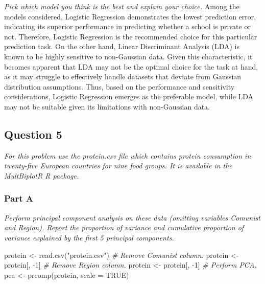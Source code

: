 \documentclass[
]{article}
\newenvironment{Shaded}{\begin{snugshade}}{\end{snugshade}}
\newcommand{\AttributeTok}[1]{\textcolor[rgb]{0.77,0.63,0.00}{#1}}
\newcommand{\CommentTok}[1]{\textcolor[rgb]{0.56,0.35,0.01}{\textit{#1}}}
\newcommand{\ConstantTok}[1]{\textcolor[rgb]{0.00,0.00,0.00}{#1}}
\newcommand{\DecValTok}[1]{\textcolor[rgb]{0.00,0.00,0.81}{#1}}
\newcommand{\FunctionTok}[1]{\textcolor[rgb]{0.00,0.00,0.00}{#1}}
\newcommand{\NormalTok}[1]{#1}
\newcommand{\OtherTok}[1]{\textcolor[rgb]{0.56,0.35,0.01}{#1}}
\newcommand{\SpecialCharTok}[1]{\textcolor[rgb]{0.00,0.00,0.00}{#1}}
\newcommand{\StringTok}[1]{\textcolor[rgb]{0.31,0.60,0.02}{#1}}
\begin{document}
\emph{Pick which model you think is the best and explain your choice.}
Among the models considered, Logistic Regression demonstrates the lowest
prediction error, indicating its superior performance in predicting
whether a school is private or not. Therefore, Logistic Regression is
the recommended choice for this particular prediction task. On the other
hand, Linear Discriminant Analysis (LDA) is known to be highly sensitive
to non-Gaussian data. Given this characteristic, it becomes apparent
that LDA may not be the optimal choice for the task at hand, as it may
struggle to effectively handle datasets that deviate from Gaussian
distribution assumptions. Thus, based on the performance and sensitivity
considerations, Logistic Regression emerges as the preferable model,
while LDA may not be suitable given its limitations with non-Gaussian
data.

\hypertarget{question-5}{%
\subsection{Question 5}\label{question-5}}

\emph{For this problem use the protein.csv file which contains protein
consumption in twenty-five European countries for nine food groups. It
is available in the MultBiplotR R package.}

\hypertarget{part-a-4}{%
\subsubsection{Part A}\label{part-a-4}}

\emph{Perform principal component analysis on these data (omitting
variables Comunist and Region). Report the proportion of variance and
cumulative proportion of variance explained by the first 5 principal
components.}

\begin{Shaded}
\begin{Highlighting}[]
\NormalTok{protein }\OtherTok{\textless{}{-}} \FunctionTok{read.csv}\NormalTok{(}\StringTok{"protein.csv"}\NormalTok{)}
\CommentTok{\# Remove Comunist column.}
\NormalTok{protein }\OtherTok{\textless{}{-}}\NormalTok{ protein[, }\SpecialCharTok{{-}}\DecValTok{1}\NormalTok{]}
\CommentTok{\# Remove Region column.}
\NormalTok{protein }\OtherTok{\textless{}{-}}\NormalTok{ protein[, }\SpecialCharTok{{-}}\DecValTok{1}\NormalTok{]}
\CommentTok{\# Perform PCA.}
\NormalTok{pca }\OtherTok{\textless{}{-}} \FunctionTok{prcomp}\NormalTok{(protein, }\AttributeTok{scale =} \ConstantTok{TRUE}\NormalTok{)}
\end{Highlighting}
\end{Shaded}
\end{document}
